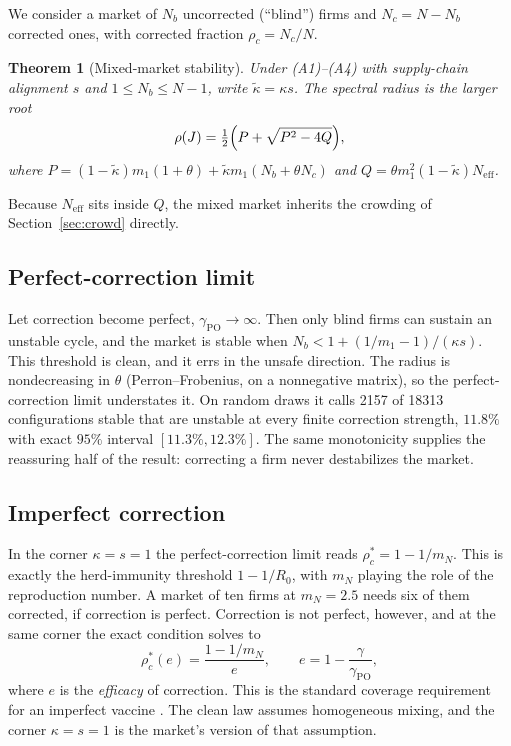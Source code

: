 \documentclass[conference]{IEEEtran}
\newtheorem{theorem}{Theorem}
\theoremstyle{definition}
\newcommand{\Neff}{N_{\mathrm{eff}}}
\newcommand{\gPO}{\gamma_{\mathrm{PO}}}
\begin{document}
We consider a market of $N_b$ uncorrected (``blind'') firms and
$N_c = N - N_b$ corrected ones, with corrected fraction $\rho_c = N_c/N$.

\begin{theorem}[Mixed-market stability]\label{thm:mixed}
Under (A1)--(A4) with supply-chain alignment $s$ and $1 \le N_b \le N-1$,
write $\tilde\kappa = \kappa s$. The spectral radius is the larger root
\begin{equation}
  \rho(J) = \tfrac{1}{2}\Bigl(P + \sqrt{P^2 - 4Q}\Bigr),
  \label{eq:mixed}
\end{equation}
where $P = (1-\tilde\kappa)m_1(1+\theta) + \tilde\kappa m_1(N_b + \theta N_c)$
and $Q = \theta m_1^2(1-\tilde\kappa)\Neff$.
\end{theorem}

Because $\Neff$ sits inside $Q$, the mixed market inherits the crowding of
Section~\ref{sec:crowd} directly.

\subsection{Perfect-correction limit}\label{sec:perfect}
Let correction become perfect, $\gPO \to \infty$. Then only blind firms can
sustain an unstable cycle, and the market is stable when
$N_b < 1 + (1/m_1 - 1)/(\kappa s)$. This threshold is clean, and it errs in
the unsafe direction. The radius is nondecreasing in $\theta$
(Perron--Frobenius, on a nonnegative matrix), so the perfect-correction limit
understates it. On random draws it calls 2157 of 18313 configurations stable
that are unstable at every finite correction strength, $11.8\%$ with exact
$95\%$ interval $[11.3\%, 12.3\%]$. The same monotonicity supplies the
reassuring half of the result: correcting a firm never destabilizes the
market.

\subsection{Imperfect correction}
In the corner $\kappa = s = 1$ the perfect-correction limit reads
$\rho_c^{*} = 1 - 1/m_N$. This is exactly the herd-immunity threshold
$1 - 1/R_0$, with $m_N$ playing the role of the reproduction number. A market
of ten firms at $m_N = 2.5$ needs six of them corrected, if correction is
perfect. Correction is not perfect, however, and at the same corner the exact
condition solves to
\begin{equation}
  \rho_c^{*}(e) = \frac{1 - 1/m_N}{e}, \qquad
  e = 1 - \frac{\gamma}{\gPO},
  \label{eq:vaccine}
\end{equation}
where $e$ is the \emph{efficacy} of correction. This is the standard coverage
requirement for an imperfect vaccine \cite{anderson1985,fine2011}. The clean
law assumes homogeneous mixing, and the corner $\kappa = s = 1$ is the
market's version of that assumption.
\end{document}
